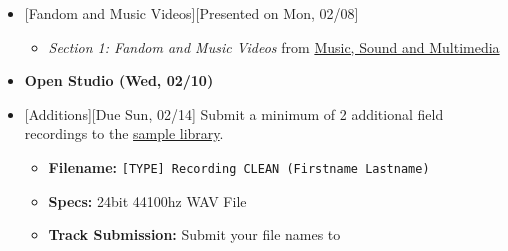 \def\dMon{Mon, 02/08}
\def\dTues{Tues, 02/09}
\def\dWed{Wed, 02/10}
\def\dThur{Thur, 02/11}
\def\dFri{Fri, 02/12}
\def\dSat{Sat, 02/13}
\def\dSun{Sun, 02/14}
\placeDate

\begin{itemize}[noitemsep,topsep=0pt,leftmargin=*]
	\item {}[Fandom and Music Videos][Presented on \dMon]
	      \begin{itemize}
		      \item \emph{Section 1: Fandom and Music Videos} from \href{supplements/Music_Sound_and_Multimedia_-_From_the_Live_to_the_Virtual_(Music_and_the_Moving_Image)_(2008).pdf}{Music, Sound and Multimedia}
	      \end{itemize}
	\item \textcolor{defaultColor}{\textbf{Open Studio (\dWed)}}
	\item {}[Additions][Due \dSun] \newline
	      Submit a minimum of 2 additional field recordings to the \href{\samplelibPermURL}{sample library}.
	      \begin{itemize}
		      \item \textbf{Filename:} \texttt{[TYPE] Recording CLEAN (Firstname Lastname)}
		      \item \textbf{Specs:} 24bit 44100hz WAV File
		      \item \textbf{Track Submission:} Submit your file names to \discordS
	      \end{itemize}
\end{itemize}